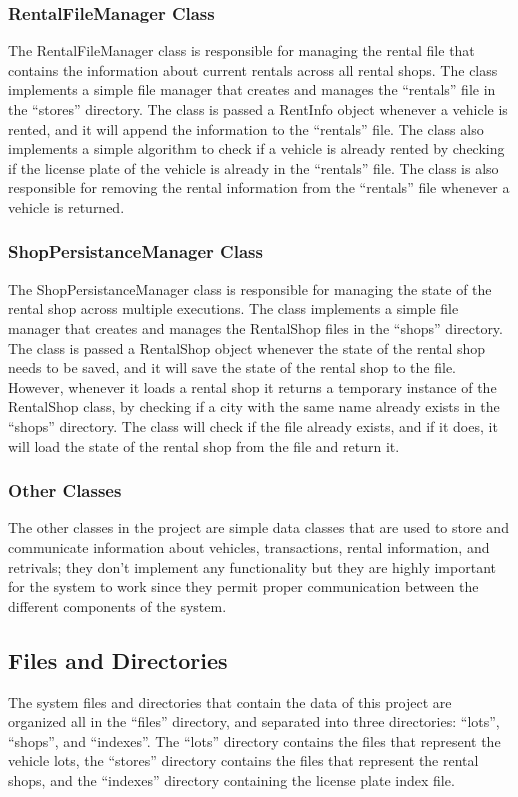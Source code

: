 \documentclass[conference]{IEEEtran}
\begin{document}
\subsubsection{RentalFileManager Class}
The RentalFileManager class is responsible for managing the rental file that contains the information about current rentals across all rental shops. The class implements a simple file manager that creates and manages the ``rentals'' file in the ``stores'' directory. The class is passed a RentInfo object whenever a vehicle is rented, and it will append the information to the ``rentals'' file. The class also implements a simple algorithm to check if a vehicle is already rented by checking if the license plate of the vehicle is already in the ``rentals'' file. The class is also responsible for removing the rental information from the ``rentals'' file whenever a vehicle is returned. 

\subsubsection{ShopPersistanceManager Class}
The ShopPersistanceManager class is responsible for managing the state of the rental shop across multiple executions. The class implements a simple file manager that creates and manages the RentalShop files in the ``shops'' directory. The class is passed a RentalShop object whenever the state of the rental shop needs to be saved, and it will save the state of the rental shop to the file. However, whenever it loads a rental shop it returns a temporary instance of the RentalShop class, by checking if a city with the same name already exists in the ``shops'' directory. The class will check if the file already exists, and if it does, it will load the state of the rental shop from the file and return it. 

\subsubsection{Other Classes}
The other classes in the project are simple data classes that are used to store and communicate information about vehicles, transactions, rental information, and retrivals; they don't implement any functionality but they are highly important for the system to work since they permit proper communication between the different components of the system.

\subsection{Files and Directories}
The system files and directories that contain the data of this project are organized all in the ``files'' directory, and separated into three directories: ``lots'', ``shops'', and ``indexes''. The ``lots'' directory contains the files that represent the vehicle lots, the ``stores'' directory contains the files that represent the rental shops, and the ``indexes'' directory containing the license plate index file. 
\end{document}

